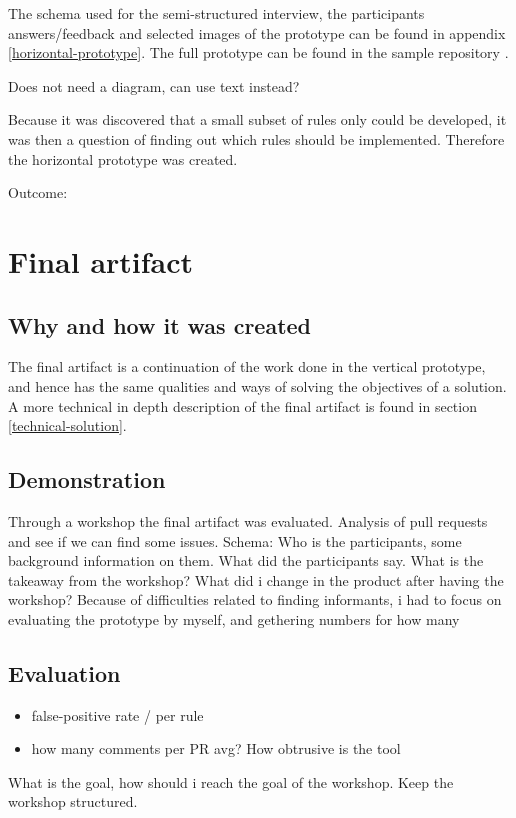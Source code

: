 \documentclass{report}
\begin{document}
The schema used for the semi-structured interview, the participants answers/feedback and selected images of the prototype can be found in appendix \ref{horizontal-prototype}. The full prototype can be found in the sample repository \cite{sample-repository}. 

Does not need a diagram, can use text instead?

Because it was discovered that a small subset of rules only could be developed, it was then a question of finding out which rules should be implemented. Therefore the horizontal prototype was created.


Outcome:


\section{Final artifact}
\subsection*{Why and how it was created}
The final artifact is a continuation of the work done in the vertical prototype, and hence has the same qualities and ways of solving the objectives of a solution. A more technical in depth description of the final artifact is found in section \ref{technical-solution}. 


\subsection*{Demonstration}
Through a workshop the final artifact was evaluated. Analysis of pull requests and see if we can find some issues.
Schema:
Who is the participants, some background information on them. What did the participants say. What is the takeaway from the workshop? What did i change in the product after having the workshop? Because of difficulties related to finding informants, i had to focus on evaluating the prototype by myself, and gethering numbers for how many 

\subsection*{Evaluation}
\begin{itemize}
    \item false-positive rate / per rule
    \item how many comments per PR avg? How obtrusive is the tool
\end{itemize}

What is the goal, how should i reach the goal of the workshop. Keep the workshop structured.
\end{document}
